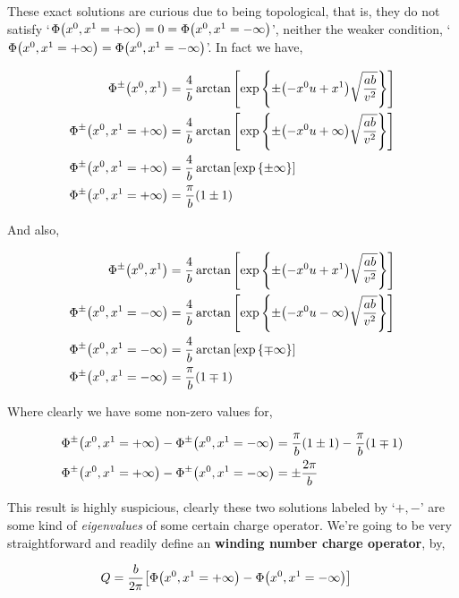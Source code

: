 These exact solutions are curious due to being topological, that is, they do not satisfy 
`$\Phi\qty(x^0,x^1=+\infty)=0=\Phi\qty(x^0,x^1=-\infty)$', neither the weaker condition, 
`$\Phi\qty(x^0,x^1=+\infty)=\Phi\qty(x^0,x^1=-\infty)$'. In fact we have,

\begin{align}
    \Phi^\pm\qty(x^0,x^1)&=\frac4b\arctan\qty[\exp\qty{\pm\qty(-x^0u+x^1)\sqrt{\frac{ab}{v^2}}}]\nonumber\\
    \Phi^\pm\qty(x^0,x^1=+\infty)&=\frac4b\arctan\qty[\exp\qty{\pm\qty(-x^0u+\infty)\sqrt{\frac{ab}{v^2}}}]\nonumber\\
    \Phi^\pm\qty(x^0,x^1=+\infty)&=\frac4b\arctan\qty[\exp\qty{\pm\infty}]\nonumber\\
    \Phi^\pm\qty(x^0,x^1=+\infty)&=\frac\pi b\qty(1\pm 1)\nonumber
\end{align}

And also,

\begin{align}
    \Phi^\pm\qty(x^0,x^1)&=\frac4b\arctan\qty[\exp\qty{\pm\qty(-x^0u+x^1)\sqrt{\frac{ab}{v^2}}}]\nonumber\\
    \Phi^\pm\qty(x^0,x^1=-\infty)&=\frac4b\arctan\qty[\exp\qty{\pm\qty(-x^0u-\infty)\sqrt{\frac{ab}{v^2}}}]\nonumber\\
    \Phi^\pm\qty(x^0,x^1=-\infty)&=\frac4b\arctan\qty[\exp\qty{\mp\infty}]\nonumber\\
    \Phi^\pm\qty(x^0,x^1=-\infty)&=\frac\pi b\qty(1\mp 1)\nonumber
\end{align}

Where clearly we have some non-zero values for,

\begin{align}
    \Phi^\pm\qty(x^0,x^1=+\infty)-\Phi^\pm\qty(x^0,x^1=-\infty)&=\frac\pi b\qty(1\pm 1)-\frac\pi b\qty(1\mp 1)\nonumber\\
    \Phi^\pm\qty(x^0,x^1=+\infty)-\Phi^\pm\qty(x^0,x^1=-\infty)&=\pm\frac{2\pi}{b}\nonumber
\end{align}

This result is highly suspicious, clearly these two solutions labeled by `$+,-$' are some kind of 
\textit{eigenvalues} of some certain charge operator. We're going to be very straightforward and readily 
define an \textbf{winding number charge operator}, by,

\begin{align}
    Q&=\frac{b}{2\pi}\qty[\Phi\qty(x^0,x^1=+\infty)-\Phi\qty(x^0,x^1=-\infty)]\nonumber
\end{align}

